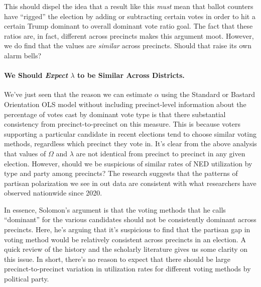 \documentclass[12pt]{article}
\begin{document}
This should dispel the idea that a result like this \emph{must} mean that ballot counters have ``rigged'' the election by adding or subtracting certain votes in order to hit a certain Trump dominant to overall dominant vote ratio goal. The fact that these ratios are, in fact, different across precincts makes this argument moot. However, we do find that the values are \emph{similar} across precincts. Should that raise its own alarm bells?

\paragraph{\texorpdfstring{We Should \emph{Expect} \(\lambda\) to be Similar Across Districts.}{We Should Expect \textbackslash lambda to be Similar Across Districts.}}\label{we-should-expect-lambda-to-be-similar-across-districts.}

We've just seen that the reason we can estimate \(\alpha\) using the Standard or Bastard Orientation OLS model without including precinct-level information about the percentage of votes cast by dominant vote type is that there substantial consistency from precinct-to-precinct on this measure. This is because voters supporting a particular candidate in recent elections tend to choose similar voting methods, regardless which precinct they vote in. It's clear from the above analysis that values of \(\Omega\) and \(\lambda\) are not identical from precinct to precinct in any given election. However, should we be suspicious of similar rates of NED utilization by type and party among precincts? The research suggests that the patterns of partisan polarization we see in out data are consistent with what researchers have observed nationwide since 2020.

In essence, Solomon's argument is that the voting methods that he calls ``dominant'' for the various candidates should not be consistently dominant across precincts. Here, he's arguing that it's suspicious to find that the partisan gap in voting method would be relatively consistent across precincts in an election. A quick review of the history and the scholarly literature gives us some clarity on this issue. In short, there's no reason to expect that there should be large precinct-to-precinct variation in utilization rates for different voting methods by political party.
\end{document}
